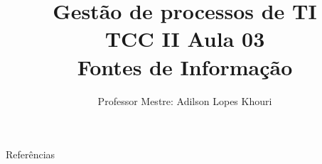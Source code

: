 \documentclass[compress, hyperref={pdfpagelayout=SinglePage}]{beamer}
\title[TCC II - Aula 03]{Gestão de processos de TI \\ TCC II Aula 03 \\ Fontes de Informação}
\author{Professor Mestre: Adilson Lopes Khouri}
\begin{document}
	
	\begin{frame}
		\titlepage
	\end{frame}
	
	
	
	
	
	
	
	

	
	
			
	\begin{frame}[allowframebreaks]{}
		\begin{block}{Referências}
			\tiny
			\nocite{*}
			
	    		
	    	\end{block}
	\end{frame}
	
\end{document}
